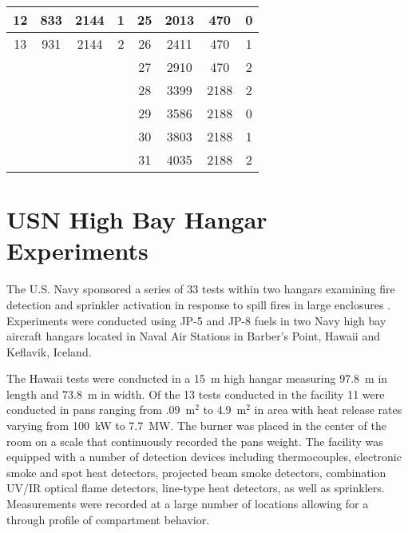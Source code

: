 \begin{table}[h!]
\begin{center}
\begin{tabular}{|c|c|c|c||c|c|c|c|}
12      & 833       & 2144          & 1         & 25      & 2013      & 470           & 0                 \\ \hline
13      & 931       & 2144          & 2         & 26      & 2411      & 470           & 1                 \\ \hline
\multicolumn{4}{|r||}{}                         & 27      & 2910      & 470           & 2                 \\ \cline{5-8}
\multicolumn{4}{|r||}{}                         & 28      & 3399      & 2188          & 2                 \\ \cline{5-8}
\multicolumn{4}{|r||}{}                         & 29      & 3586      & 2188          & 0                 \\ \cline{5-8}
\multicolumn{4}{|r||}{}                         & 30      & 3803      & 2188          & 1                 \\ \cline{5-8}
\multicolumn{4}{|r||}{}                         & 31      & 4035      & 2188          & 2                 \\ \hline
\end{tabular}
\end{center}
\label{UL_NIST_Table}
\end{table}

\section{USN High Bay Hangar Experiments}

The U.S. Navy sponsored a series of 33 tests within two hangars examining fire detection and sprinkler activation in response to spill fires in large enclosures \cite{Gott:1997, Davis:2000}. Experiments were conducted using JP-5 and JP-8 fuels in two Navy high bay aircraft hangars located in Naval Air Stations in Barber's Point, Hawaii and Keflavik, Iceland.

The Hawaii tests were conducted in a 15~m high hangar measuring 97.8~m in length and 73.8~m in width. Of the 13 tests conducted in the facility 11 were conducted in pans ranging from .09~m$^2$ to 4.9~m$^2$ in area with heat release rates varying from 100~kW to 7.7~MW. The burner was placed in the center of the room on a scale that continuously recorded the pans weight. The facility was equipped with a number of detection devices including thermocouples, electronic smoke and spot heat detectors, projected beam smoke detectors, combination UV/IR optical flame detectors, line-type heat detectors, as well as sprinklers. Measurements were recorded at a large number of locations allowing for a through profile of compartment behavior.

